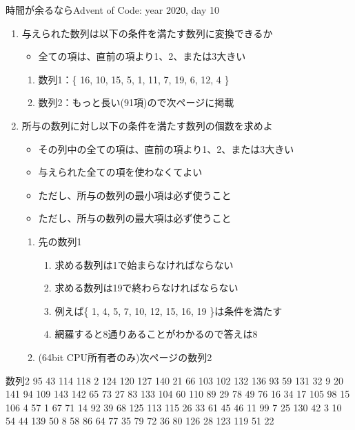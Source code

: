 \documentclass{beamer}
\begin{document}
\begin{frame}[fragile]{時間が余るなら}{Advent of Code: year 2020, day 10}
\begin{enumerate}\itemsep8pt
\item 与えられた数列は以下の条件を満たす数列に変換できるか
\begin{itemize}%
\item 全ての項は、直前の項より1、2、または3大きい
\end{itemize}
\begin{enumerate}%
\item 数列1：\{ 16, 10, 15, 5, 1, 11, 7, 19, 6, 12, 4 \}
\item 数列2：もっと長い(91項)ので次ページに掲載
\end{enumerate}
\item 所与の数列に対し以下の条件を満たす数列の個数を求めよ
\begin{itemize}%
\item その列中の全ての項は、直前の項より1、2、または3大きい
\item 与えられた全ての項を使わなくてよい
\item ただし、所与の数列の最小項は必ず使うこと
\item ただし、所与の数列の最大項は必ず使うこと
\end{itemize}
\begin{enumerate}%
\item 先の数列1
\begin{enumerate}%
\item 求める数列は1で始まらなければならない
\item 求める数列は19で終わらなければならない
\item 例えば\{ 1, 4, 5, 7, 10, 12, 15, 16, 19 \}は条件を満たす
\item 網羅すると8通りあることがわかるので答えは8
\end{enumerate}
\item (64bit CPU所有者のみ)次ページの数列2
\end{enumerate}
\end{enumerate}
\end{frame}

\begin{frame}[fragile]{数列2}{}
95
43
114
118
2
124
120
127
140
21
66
103
102
132
136
93
59
131
32
9
20
141
94
109
143
142
65
73
27
83
133
104
60
110
89
29
78
49
76
16
34
17
105
98
15
106
4
57
1
67
71
14
92
39
68
125
113
115
26
33
61
45
46
11
99
7
25
130
42
3
10
54
44
139
50
8
58
86
64
77
35
79
72
36
80
126
28
123
119
51
22
\end{frame}
\end{document}
